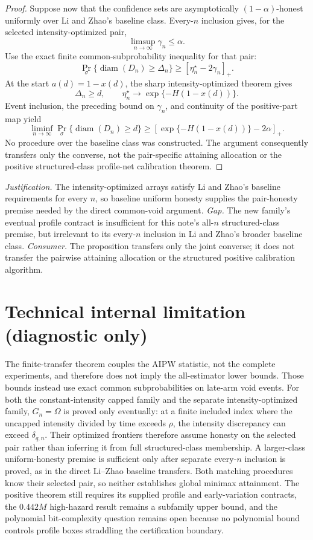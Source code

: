 \documentclass{article}
\begin{document}
\begin{proof}
Suppose now that the confidence sets are asymptotically \((1-\alpha)\)-honest uniformly over Li and Zhao's baseline class.  Every-\(n\) inclusion gives, for the selected intensity-optimized pair,
\[
 \limsup_{n\to\infty}\gamma_n\le\alpha.
\]
Use the exact finite common-subprobability inequality for that pair:
\[
 \Pr_\sigma\{\operatorname{diam}(D_n)\ge\Delta_n\}
 \ge[\eta_n^\star-2\gamma_n]_+.
\]
At the start \(a(d)=1-x(d)\), the sharp intensity-optimized theorem gives
\[
 \Delta_n\ge d,
 \qquad
 \eta_n^\star\longrightarrow\exp\{-H(1-x(d))\}.
\]
Event inclusion, the preceding bound on \(\gamma_n\), and continuity of the positive-part map yield
\[
 \liminf_{n\to\infty}
 \Pr_\sigma\{\operatorname{diam}(D_n)\ge d\}
 \ge
 \left[\exp\{-H(1-x(d))\}-2\alpha\right]_+.
\]
No procedure over the baseline class was constructed.  The argument consequently transfers only the converse, not the pair-specific attaining allocation or the positive structured-class profile-net calibration theorem.
\end{proof}
\par\smallskip\noindent \textit{Justification.} The intensity-optimized arrays satisfy Li and Zhao's baseline requirements for every \(n\), so baseline uniform honesty supplies the pair-honesty premise needed by the direct common-void argument. \textit{Gap.} The new family's eventual profile contract is insufficient for this note's all-\(n\) structured-class premise, but irrelevant to its every-\(n\) inclusion in Li and Zhao's broader baseline class. \textit{Consumer.} The proposition transfers only the joint converse; it does not transfer the pairwise attaining allocation or the structured positive calibration algorithm.

\section*{Technical internal limitation (diagnostic only)}

The finite-transfer theorem couples the AIPW statistic, not the complete experiments, and therefore does not imply the all-estimator lower bounds. Those bounds instead use exact common subprobabilities on late-arm void events. For both the constant-intensity capped family and the separate intensity-optimized family, \(G_n=\Omega\) is proved only eventually: at a finite included index where the uncapped intensity divided by time exceeds \(\rho\), the intensity discrepancy can exceed \(\delta_{q,n}\). Their optimized frontiers therefore assume honesty on the selected pair rather than inferring it from full structured-class membership. A larger-class uniform-honesty premise is sufficient only after separate every-\(n\) inclusion is proved, as in the direct Li--Zhao baseline transfers. Both matching procedures know their selected pair, so neither establishes global minimax attainment. The positive theorem still requires its supplied profile and early-variation contracts, the \(0.442M\) high-hazard result remains a subfamily upper bound, and the polynomial bit-complexity question remains open because no polynomial bound controls profile boxes straddling the certification boundary.
\end{document}
